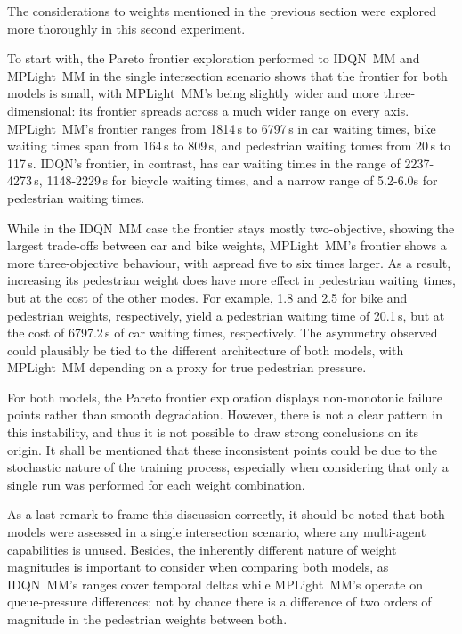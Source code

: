 The considerations to weights mentioned in the previous section were explored more thoroughly in this second experiment.

To start with, the Pareto frontier exploration performed to IDQN~MM and MPLight~MM in the single intersection scenario shows that the frontier for both models is small, with MPLight~MM's being slightly wider and more three-dimensional: its frontier spreads across a much wider range on every axis. MPLight~MM's frontier ranges from 1814\,s to 6797\,s in car waiting times, bike waiting times span from 164\,s to 809\,s, and pedestrian waiting tomes from 20\,s to 117\,s. IDQN's frontier, in contrast, has car waiting times in the range of 2237-4273\,s, 1148-2229\,s for bicycle waiting times, and a narrow range of 5.2-6.0s for pedestrian waiting times.

While in the IDQN~MM case the frontier stays mostly two-objective, showing the largest trade-offs between car and bike weights, MPLight~MM's frontier shows a more three-objective behaviour, with aspread five to six times larger. As a result, increasing its pedestrian weight does have more effect in pedestrian waiting times, but at the cost of the other modes. For example, 1.8 and 2.5 for bike and pedestrian weights, respectively, yield a pedestrian waiting time of 20.1\,s, but at the cost of 6797.2\,s of car waiting times, respectively. The asymmetry observed could plausibly be tied to the different architecture of both models, with MPLight~MM depending on a proxy for true pedestrian pressure.

\medskip

\noindent For both models, the Pareto frontier exploration displays non-monotonic failure points rather than smooth degradation. However, there is not a clear pattern in this instability, and thus it is not possible to draw strong conclusions on its origin. It shall be mentioned that these inconsistent points could be due to the stochastic nature of the training process, especially when considering that only a single run was performed for each weight combination.

As a last remark to frame this discussion correctly, it should be noted that both models were assessed in a single intersection scenario, where any multi-agent capabilities is unused. Besides, the inherently different nature of weight magnitudes is important to consider when comparing both models, as IDQN~MM's ranges cover temporal deltas while MPLight~MM's operate on queue-pressure differences; not by chance there is a difference of two orders of magnitude in the pedestrian weights between both.


